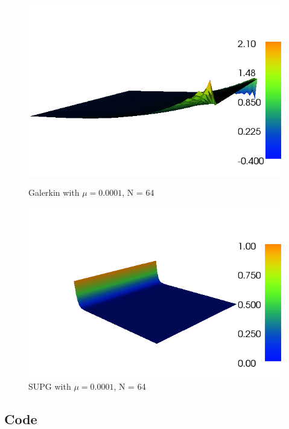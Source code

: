 \documentclass[a4paper,norsk]{article}
\begin{document}
\begin{figure}[h]
    \centering
    \includegraphics[scale=0.5]{dolfin_plot_3.png}
    \caption{Galerkin with $\mu = 0.0001$, N = 64}
    \label{fig:awesome_image}
    \includegraphics[scale=0.5]{dolfin_plot_0.png}
    \caption{SUPG with $\mu = 0.0001$, N = 64}
    \label{fig:awesome_image}
\end{figure}


\subsection*{Code}


\end{document}
